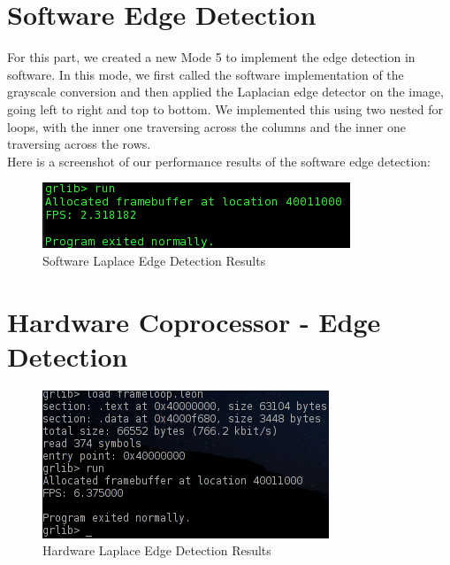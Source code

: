 \documentclass{article}
\begin{document}
\section{Software Edge Detection}

For this part, we created a new Mode 5 to implement the edge detection in software. In this mode, we first called the software implementation of the grayscale conversion and then applied the Laplacian edge detector on the image, going left to right and top to bottom. We implemented this using two nested for loops, with the inner one traversing across the columns and the inner one traversing across the rows.\\

Here is a screenshot of our performance results of the software edge detection:

	 \begin{figure}[H]
	 	\begin{center}
	 		\includegraphics[scale=0.6]{../part6_files/Software_Laplace_edge_software_performance.png}
	 		\caption{Software Laplace Edge Detection Results}
	 	\end{center}
	 \end{figure}


\section{Hardware Coprocessor - Edge Detection}

	 \begin{figure}[H]
	 	\begin{center}
	 		\includegraphics[scale=0.6]{../part7_files/Hardware_Laplace_edge_detection_performance.png}
	 		\caption{Hardware Laplace Edge Detection Results}
	 	\end{center}
	 \end{figure}
\end{document}
